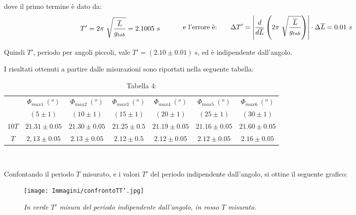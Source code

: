 \documentclass[12pt, a4paper]{article}
\begin{document}
dove il primo termine è dato da:
\begin{equation*}
\begin{aligned}
  & & \displaystyle T'=2\pi\ \sqrt{\frac{\overline{L}}{g_{tab}}}=2.1005\ s
  &\quad{} 
  \end{aligned}
  \begin{aligned}
  & &\text{ e l'errore è:\phantom{.......}} \Delta T'=\left|\frac{d}{d\overline{L}}\left( 2\pi\ \sqrt{\frac{\overline{L}}{g_{tab}}}\right)\right|\cdot\Delta\overline{L}=0.01\ s
  &
  \end{aligned}
\end{equation*}
\bigskip

Quindi $T'$, periodo per angoli piccoli, vale $T'=(2.10\pm 0.01)\ s$, ed è indipendente dall'angolo.


\addvspace{3cm}
I risultati ottenuti a partire dalle misurazioni sono riportati nella seguente tabella:

\begin{table}[ht] 
\centering
\begin{tabular}{|c|c|c|c|c|c|c|} 

 \hline
  &$\Phi_{max1}\ (^o)$ & $\Phi_{max2}\ (^o)$ & $\Phi_{max3}\ (^o)$ & $\Phi_{max4}\ (^o)$ & $\Phi_{max5}\ (^o)$ & $\Phi_{max6}\ (^o)$  \\
    &$(5\pm1)$ & $(10\pm1)$ & $(15\pm1)$ & $(20\pm1)$ & $(25\pm1)$ & $(30\pm1)$  \\
\hline

  $10T$& $21.31\pm 0.05 $&$21.30\pm0.05$&$21.25\pm0.5$&$21.19\pm0.05$ &$21.16\pm0.05$&$21.60\pm 0.05$\\
\hline
 $T$& $2,13\pm 0.05 $&$2.13\pm0.05$&$2.12\pm0.5$&$2.12\pm0.05$ &$2.12\pm0.05$&$2.16\pm 0.05$\\
\hline

\end{tabular}\\
\caption*{\centering Tabella 4:\small{\textit{ } }}
    \label{tab T indip Angolo}
\end{table}


\newpage

Confontando il periodo $T$ misurato, e i valori $T'$ del periodo indipendente dall'angolo, si ottine il seguente grafico:



    \begin{figure}[h!]
\centering
\texttt{[image: Immagini/confrontoTT'.jpg]}
\caption{\textit{{\footnotesize{In verde $T'$ misura del periodo indipendente dall'angolo, in rosso $T$ misurato.  }}}}
\label{confrontoTT'}
\end{figure}
\end{document}
